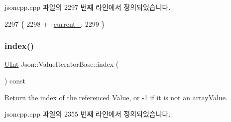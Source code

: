 jsoncpp.\+cpp 파일의 2297 번째 라인에서 정의되었습니다.


\begin{DoxyCode}
2297                                   \{
2298   ++\hyperlink{class_json_1_1_value_iterator_base_ab3138ce8af8301cca3b041ea55cb922a}{current\_};
2299 \}
\end{DoxyCode}
\mbox{\label{class_json_1_1_value_iterator_base_a549c66a0bd20e9ae772175a5c0d2e88a}} 
\subsubsection{\texorpdfstring{index()}{index()}}
{\footnotesize\ttfamily \hyperlink{namespace_json_a800fb90eb6ee8d5d62b600c06f87f7d4}{U\+Int} Json\+::\+Value\+Iterator\+Base\+::index (\begin{DoxyParamCaption}{ }\end{DoxyParamCaption}) const\hspace{0.3cm}{\ttfamily [inherited]}}



Return the index of the referenced \hyperlink{class_json_1_1_value}{Value}, or -\/1 if it is not an array\+Value. 



jsoncpp.\+cpp 파일의 2355 번째 라인에서 정의되었습니다.


